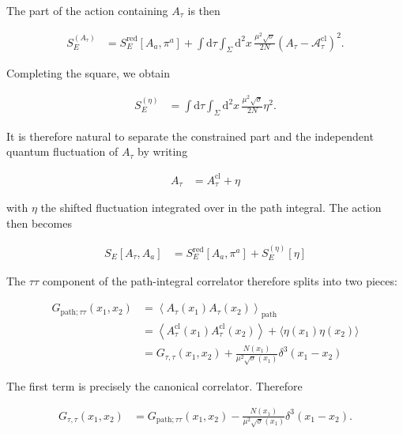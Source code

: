 The part of the action containing $A_{\tau}$ is then

\begin{align}
S_{E}^{(A_{\tau})} & =S_{E}^{\mathrm{red}}[A_{a},\pi ^{a}]+\int \mathrm{d}\tau \int _{\Sigma}\mathrm{d}^{2}x\,\frac{\mu ^{2}\sqrt{ \sigma }}{2N}\left(A_{\tau}-\mathcal{A}_{\tau}^{\mathrm{cl}}\right)^{2}.
\end{align}

Completing the square, we obtain

\begin{align}
S_{E}^{(\eta)} & =\int \mathrm{d}\tau \int _{\Sigma}\mathrm{d}^{2}x\,\frac{\mu ^{2}\sqrt{ \sigma }}{2N}\eta ^{2}.
\end{align}

It is therefore natural to separate the constrained part and the independent quantum fluctuation of $A_{\tau}$ by writing

\begin{align}
A_{\tau} & =A_{\tau}^{\mathrm{cl}}+\eta
\end{align}

with $\eta$ the shifted fluctuation integrated over in the path integral. The action then becomes

\begin{align}
S_{E}[A_{\tau},A_{a}] & =S_{E}^{\mathrm{red}}[A_{a},\pi ^{a}]+S_{E}^{(\eta)}[\eta]
\end{align}

The $\tau\tau$ component of the path-integral correlator therefore splits into two pieces:

\begin{align}
G_{\mathrm{path};\tau \tau}(x_{1},x_{2}) & = \left\langle A_{\tau}(x_{1})A_{\tau}(x_{2})\right\rangle _{\mathrm{path}} \\
 & = \left\langle A_{\tau}^{\mathrm{cl}}(x_{1})A_{\tau}^{\mathrm{cl}}(x_{2})\right\rangle +\langle \eta (x_{1})\eta (x_{2})\rangle \\
 & = G_{\tau,\tau}(x_{1},x_{2})+\frac{N(x_{1})}{\mu ^{2}\sqrt{ \sigma }(x_{1})}\delta ^{3}(x_{1}-x_{2})
\end{align}

The first term is precisely the canonical correlator. Therefore

\begin{align}
G_{\tau,\tau}(x_{1},x_{2}) & =G_{\mathrm{path};\tau \tau}(x_{1},x_{2})-\frac{N(x_{1})}{\mu ^{2}\sqrt{ \sigma }(x_{1})}\delta ^{3}(x_{1}-x_{2}).
\end{align}

